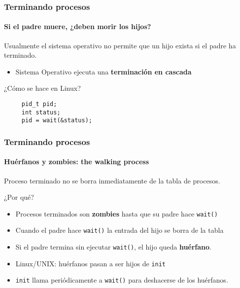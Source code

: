 \documentclass[letter]{beamer}
\begin{document}
\begin{frame}[fragile]
  \frametitle{Terminando procesos}
  \framesubtitle{Si el padre muere, ¿deben morir los hijos?}

  Usualmente el sistema operativo no permite que un hijo exista si el padre ha terminado.
  \begin{itemize}
    \item Sistema Operativo ejecuta una {\bf terminación en cascada}
  \end{itemize}
  
  ¿Cómo se hace en Linux? 
  
\begin{verbatim}
     pid_t pid;
     int status;
     pid = wait(&status);
\end{verbatim}

\end{frame}

\begin{frame}
  \frametitle{Terminando procesos}
  \framesubtitle{Huérfanos y zombies: the walking process}

  Proceso terminado no se borra inmediatamente de la tabla de procesos.
  
  ¿Por qué? 

  \begin{itemize}
    \item<3-> Procesos terminados son {\bf zombies} hasta que su padre hace {\tt wait()}
    \item<4-> Cuando el padre hace {\tt wait()} la entrada del hijo se borra de la tabla
  \end{itemize}

  \begin{itemize}
    \item<6->Si el padre termina sin ejecutar {\tt wait()}, el hijo queda {\bf huérfano}.
    \item<7->Linux/UNIX: huérfanos pasan a ser hijos de {\tt init}
    \item<7->{\tt init} llama periódicamente a {\tt wait()} para deshacerse de los huérfanos.
  \end{itemize}

\end{frame}
\end{document}
